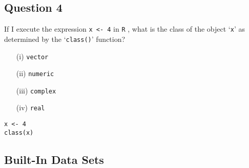 \documentclass[12pt]{article}
\begin{document}
\subsection*{Question 4}
\Large
If I execute the expression \texttt{x <- 4} in \texttt{R}
, what is the class of the object `\texttt{x}' as determined by the `\texttt{class()}' function?
\begin{itemize}
	\item[(i)] \texttt{vector}
	\item[(ii)] \texttt{numeric}
	\item[(iii)] \texttt{complex}
	\item[(iv)] \texttt{real}
\end{itemize}

\begin{framed}
\begin{verbatim}
x <- 4
class(x)

\end{verbatim}	
\end{framed}
\newpage
\subsection*{Built-In Data Sets} %
\end{document}
